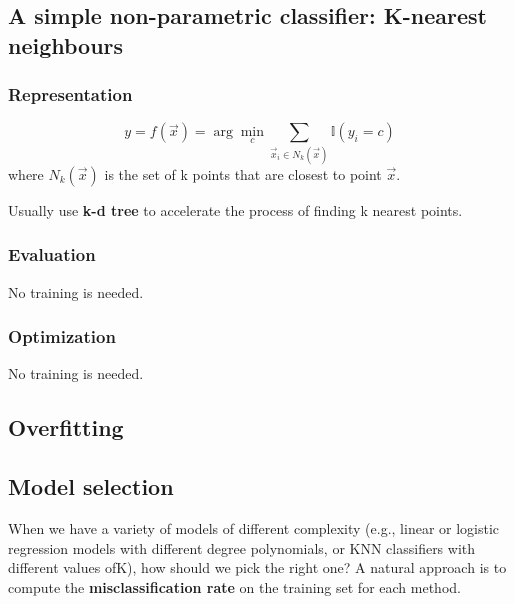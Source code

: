\subsection{A simple non-parametric classifier: K-nearest neighbours}

\subsubsection{Representation}
\begin{equation}
y=f(\vec{x})=\arg\min_{c}{\sum\limits_{\vec{x}_i \in N_k(\vec{x})} \mathbb{I}(y_i=c)}
\end{equation}
where $N_k(\vec{x})$ is the set of k points that are closest to point $\vec{x}$.

Usually use \textbf{k-d tree} to accelerate the process of finding k nearest points.

\subsubsection{Evaluation}
No training is needed.

\subsubsection{Optimization}
No training is needed.


\subsection{Overfitting}


\subsection{Model selection}
When we have a variety of models of different complexity (e.g., linear or logistic regression models with different degree polynomials, or KNN classifiers with different values ofK), how should we pick the right one? A natural approach is to compute the \textbf{misclassification rate} on the training set for each method.


